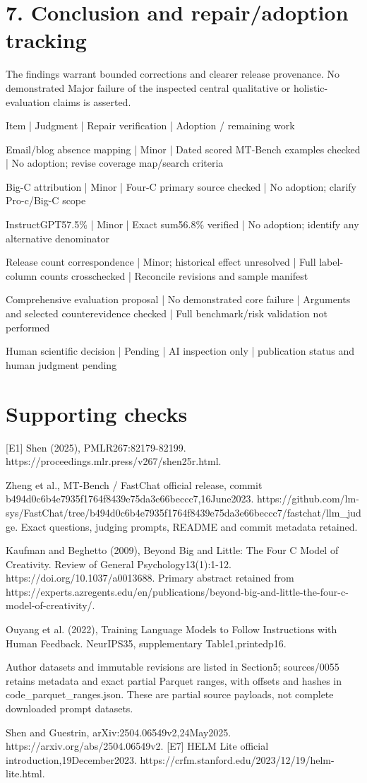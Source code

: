 \documentclass[10pt]{article}
\begin{document}
\section*{7. Conclusion and repair/adoption tracking}
The findings warrant bounded corrections and clearer release provenance. No demonstrated Major failure of the inspected central qualitative or holistic-evaluation claims is asserted.\par
Item | Judgment | Repair verification | Adoption / remaining work\par
Email/blog absence mapping | Minor | Dated scored MT-Bench examples checked | No adoption; revise coverage map/search criteria\par
Big-C attribution | Minor | Four-C primary source checked | No adoption; clarify Pro-c/Big-C scope\par
InstructGPT57.5\% | Minor | Exact sum56.8\% verified | No adoption; identify any alternative denominator\par
Release count correspondence | Minor; historical effect unresolved | Full label-column counts crosschecked | Reconcile revisions and sample manifest\par
Comprehensive evaluation proposal | No demonstrated core failure | Arguments and selected counterevidence checked | Full benchmark/risk validation not performed\par
Human scientific decision | Pending | AI inspection only | publication status and human judgment pending\par
\section*{Supporting checks}
[E1] Shen (2025), PMLR267:82179-82199. https://proceedings.mlr.press/v267/shen25r.html.\par
Zheng et al., MT-Bench / FastChat official release, commit b494d0c6b4e7935f1764f8439e75da3e66beccc7,16June2023. https://github.com/lm-sys/FastChat/tree/b494d0c6b4e7935f1764f8439e75da3e66beccc7/fastchat/llm\_judge. Exact questions, judging prompts, README and commit metadata retained.\par
Kaufman and Beghetto (2009), Beyond Big and Little: The Four C Model of Creativity. Review of General Psychology13(1):1-12. https://doi.org/10.1037/a0013688. Primary abstract retained from https://experts.azregents.edu/en/publications/beyond-big-and-little-the-four-c-model-of-creativity/.\par
Ouyang et al. (2022), Training Language Models to Follow Instructions with Human Feedback. NeurIPS35, supplementary Table1,printedp16.\par
Author datasets and immutable revisions are listed in Section5; sources/0055 retains metadata and exact partial Parquet ranges, with offsets and hashes in code\_parquet\_ranges.json. These are partial source payloads, not complete downloaded prompt datasets.\par
Shen and Guestrin, arXiv:2504.06549v2,24May2025. https://arxiv.org/abs/2504.06549v2. [E7] HELM Lite official introduction,19December2023. https://crfm.stanford.edu/2023/12/19/helm-lite.html.\par
\end{document}
